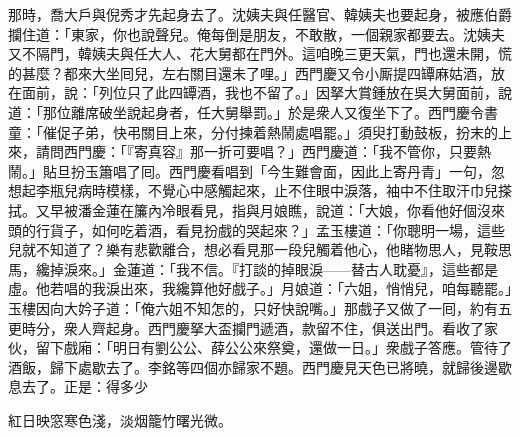 那時，喬大戶與倪秀才先起身去了。沈姨夫與任醫官、韓姨夫也要起身，被應伯爵攔住道：「東家，你也說聲兒。俺每倒是朋友，不敢散，一個親家都要去。沈姨夫又不隔門，韓姨夫與任大人、花大舅都在門外。這咱晚三更天氣，門也還未開，慌的甚麼？{}都來大坐囘兒，左右關目還未了哩。」西門慶又令小厮提四罈麻姑酒，放在面前，說：「列位只了此四罈酒，我也不留了。」因拏大賞鍾放在吳大舅面前，說道：「那位離席破坐說起身者，任大舅舉罰。」於是衆人又復坐下了。西門慶令書童：「催促子弟，快弔關目上來，分付揀着熱鬧處唱罷。」須臾打動鼓板，扮末的上來，請問西門慶：「『寄真容』那一折可要唱？」西門慶道：「我不管你，只要熱鬧。」貼旦扮玉簫唱了囘。西門慶看唱到「今生難會面，因此上寄丹青」一句，忽想起李瓶兒病時模樣，不覺心中感觸起來，止不住眼中淚落，袖中不住取汗巾兒搽拭。{}又早被潘金蓮在簾內冷眼看見，{}指與月娘瞧，說道：「大娘，你看他好個沒來頭的行貨子，如何吃着酒，看見扮戲的哭起來？」孟玉樓道：「你聰明一場，這些兒就不知道了？樂有悲歡離合，想必看見那一段兒觸着他心，他睹物思人，見鞍思馬，纔掉淚來。」金蓮道：「我不信。『打談的掉眼淚——替古人耽憂』，這些都是虛。他若唱的我淚出來，我纔算他好戲子。」{}月娘道：「六姐，悄悄兒，咱每聽罷。」玉樓因向大妗子道：「俺六姐不知怎的，只好快說嘴。」那戲子又做了一囘，約有五更時分，衆人齊起身。西門慶拏大盃攔門遞酒，款留不住，俱送出門。看收了家伙，留下戲廂：「明日有劉公公、薛公公來祭奠，還做一日。」衆戲子答應。管待了酒飯，歸下處歇去了。李銘等四個亦歸家不題。西門慶見天色已將曉，就歸後邊歇息去了。正是：得多少

\begin{myquote} 
紅日映窓寒色淺，淡烟籠竹曙光微。
\end{myquote} 

